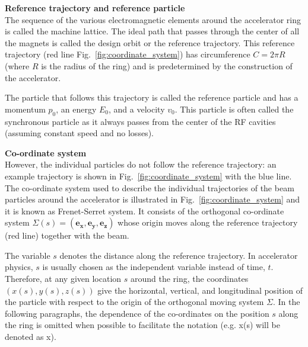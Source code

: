 \textbf{Reference trajectory and reference particle}\\
The sequence of the various electromagnetic elements around the accelerator ring is called the machine lattice. The ideal path that passes through the center of all the magnets is called the design orbit or the reference trajectory. This reference trajectory (red line Fig.~\ref{fig:coordinate_system}) has circumference $C=2\pi R$ (where $R$ is the radius of the ring) and is predetermined by the construction of the accelerator. 

The particle that follows this trajectory is called the reference particle and has a momentum $p_0$, an energy $E_0$, and a velocity $v_0$. This particle is often called the synchronous particle as it always passes from the center of the RF cavities (assuming constant speed and no losses). %

\textbf{Co-ordinate system}\\
However, the individual particles do not follow the reference trajectory: an example trajectory is shown in Fig.~\ref{fig:coordinate_system} with the blue line. The co-ordinate system used to describe the individual trajectories of the beam particles around the accelerator is illustrated in Fig.~\ref{fig:coordinate_system} and it is known as Frenet-Serret system.  It consists of the orthogonal co-ordinate system $\Sigma(s) = (\mathbf{e_x}, \mathbf{e_y}, \mathbf{e_z})$ whose origin moves along the reference trajectory (red line) together with the beam. 

The variable $s$ denotes the distance along the reference trajectory. In accelerator physics, $s$ is usually chosen as the independent variable instead of time, $t$.  %
Therefore, at any given location $s$ around the ring, the coordinates $(x(s), y(s), z(s))$ give the horizontal, vertical, and longitudinal position of the particle with respect to the origin of the orthogonal moving system $\Sigma$. In the following paragraphs, the dependence of the co-ordinates on the position $s$ along the ring is omitted when possible to facilitate the notation (e.g. x(s) will be denoted as x).

